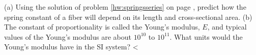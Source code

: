 (a) Using the solution of problem \ref{hw:springsseries}
        on page \pageref{hw:springsseries}, predict how the spring constant of
        a fiber will depend on its length and cross-sectional area.\hwendpart
        (b) The constant of proportionality is called the Young's
        modulus, $E$, and typical values of the Young's modulus are
        about $10^{10}$ to $10^{11}$. What units would the Young's modulus
        have in the SI system?
        <%
